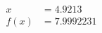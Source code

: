 \documentclass[preview]{standalone}
\begin{document}
\begin{align*}
x &= 4.9213\\f(x) &= 7.9992231
\end{align*}
\end{document}

